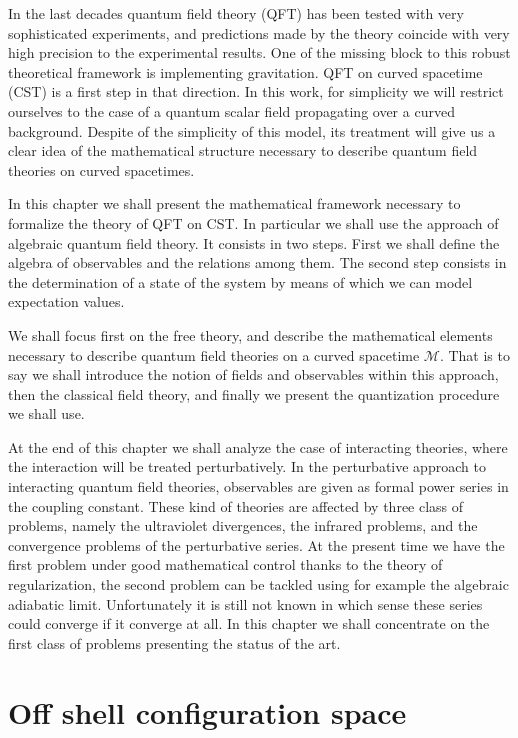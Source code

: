 \documentclass[11pt]{book}
\newcommand{\Mcal}{\mathcal{M}}
\theoremstyle{break}
\begin{document}
In the last decades quantum field theory (QFT) has been tested with very sophisticated experiments, and predictions made by the theory coincide with very high precision to the experimental results. One of the missing block to this robust theoretical framework is implementing gravitation. QFT on curved spacetime (CST) is a first step in that direction. In this work, for simplicity we will restrict ourselves to the case of a quantum scalar field propagating over a curved background. Despite of the simplicity of this model, its treatment will give us a clear idea of the mathematical structure necessary to describe quantum field theories on curved spacetimes.


In this chapter we shall present the mathematical framework necessary to formalize the theory of QFT on CST. In particular we shall use the approach of algebraic quantum field theory. It consists in two steps. First we shall define the algebra of observables and the relations among them. The second step consists in the determination of a state of the system by means of which we can model expectation values.


We shall focus first on the free theory, and describe the mathematical elements necessary to describe quantum field theories on a curved spacetime $\Mcal$. That is to say we shall introduce the notion of fields and observables within this approach, then the classical field theory, and finally we present the quantization procedure we shall use.


At the end of this chapter we shall analyze the case of interacting theories, where the interaction will be treated perturbatively. In the perturbative approach to interacting quantum field theories, observables are given as formal power series in the coupling constant. These kind of theories are affected by three class of problems, namely the ultraviolet divergences, the infrared problems, and the convergence problems of the perturbative series. At the present time we have the first problem under good mathematical control thanks to the theory of regularization, the second problem can be tackled using for example the algebraic adiabatic limit. Unfortunately it is still not known in which sense these series could converge if it converge at all. In this chapter we shall concentrate on the first class of problems presenting the status of the art.


\section{Off shell configuration space}
\label{p:OFF_SHELL_CONFIG_SPACE}
\end{document}
